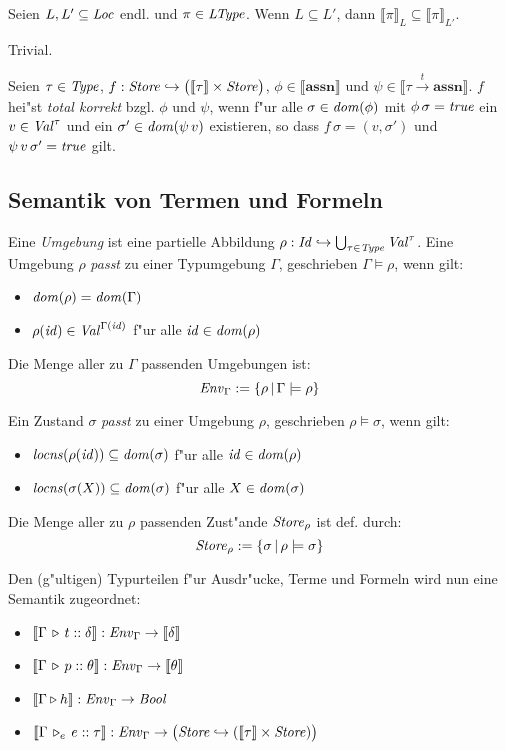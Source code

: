 \documentclass[12pt,a4paper,bigheadings]{scrartcl}
\newcommand{\semantic}[1]{\ensuremath{\llbracket#1\rrbracket}}
\newcommand{\assn}{\ensuremath{\mathbf{assn}}}
\newcommand{\locns}{\name{locns}}
\newcommand{\tto}{\ensuremath{\xrightarrow{t}}}
\newcommand{\Tje}[3]{#1 \,\tr_e\, #2\cc#3}
\begin{document}
\begin{lemma}
  Seien $L,L'\subseteq{\text{\it Loc\/}}$ endl. und $\pi\in{\text{\it LType\/}}$. Wenn $L\subseteq L'$, dann
  $\semantic{\pi}_{L} \subseteq \semantic{\pi}_{L'}$.
\end{lemma}

\begin{beweis}
  Trivial.
\end{beweis}

\begin{definition}
  Seien $\tau\in{\text{\it Type\/}}$, $f:\Store \pto \bigl(\semantic{\tau} \times \Store\bigr)$,
  $\phi\in\semantic{\assn}$ und $\psi \in \semantic{\tau \tto \assn}$. $f$ hei"st
  {\em total korrekt} bzgl. $\phi$ und $\psi$, wenn f"ur alle $\sigma\in{\text{\it dom\/}}(\phi)$
  mit $\phi\,\sigma={\text{\it true\/}}$ ein $v\in{\text{\it Val\/}}^\tau$ und ein $\sigma'\in{\text{\it dom\/}}(\psi\,v)$
  existieren, so dass $f\,\sigma = (v,\sigma')$ und $\psi\,v\,\sigma'={\text{\it true\/}}$ gilt.
\end{definition}


\subsection{Semantik von Termen und Formeln}

Eine {\em Umgebung} ist eine partielle Abbildung $\rho:{\text{\it Id\/}}\hookrightarrow\bigcup_{\tau\in{\text{\it Type\/}}} {\text{\it Val\/}}^\tau$.
Eine Umgebung $\rho$ {\em passt} zu einer Typumgebung $\Gamma$, geschrieben $\Gamma \models \rho$,
wenn gilt:
\begin{itemize}
  \item ${\text{\it dom\/}}(\rho) = {\text{\it dom\/}}(\Gamma)$
  \item $\rho({\text{\it id\/}}) \in {\text{\it Val\/}}^{\Gamma({\text{\it id\/}})}$ f"ur alle ${\text{\it id\/}}\in{\text{\it dom\/}}(\rho)$
\end{itemize}
Die Menge aller zu $\Gamma$ passenden Umgebungen ist:
\[
  {\text{\it Env\/}}_\Gamma := \{\rho\,|\,\Gamma \models \rho\}
\]

\noindent
Ein Zustand $\sigma$ {\em passt} zu einer Umgebung $\rho$, geschrieben $\rho \models \sigma$,
wenn gilt:
\begin{itemize}
  \item $\locns(\rho(\id)) \subseteq \dom{\sigma}$ f"ur alle ${\text{\it id\/}}\in{\text{\it dom\/}}(\rho)$
  \item $\locns(\sigma(X)) \subseteq \dom{\sigma}$ f"ur alle $X\in{\text{\it dom\/}}(\sigma)$
\end{itemize}
Die Menge aller zu $\rho$ passenden Zust"ande ${\text{\it Store\/}}_\rho$ ist def. durch:
\[
  {\text{\it Store\/}}_\rho := \{\sigma\,|\,\rho\models\sigma\}
\]

\noindent
Den (g"ultigen) Typurteilen f"ur Ausdr"ucke, Terme und Formeln wird nun eine Semantik zugeordnet:
\begin{itemize}
  \item $\semantic{\Tj{\Gamma}{t}{\delta}}:\Env_\Gamma \to \semantic{\delta}$
  \item $\semantic{\Tj{\Gamma}{p}{\theta}}:\Env_\Gamma \to \semantic{\theta}$
  \item $\semantic{\Tjh{\Gamma}{h}}: \Env_\Gamma \to \Bool$
  \item $\semantic{\Tje{\Gamma}{e}{\tau}}: \Env_\Gamma \to \bigl( \Store \pto (\semantic{\tau}\times\Store) \bigr)$
\end{itemize}
\end{document}
